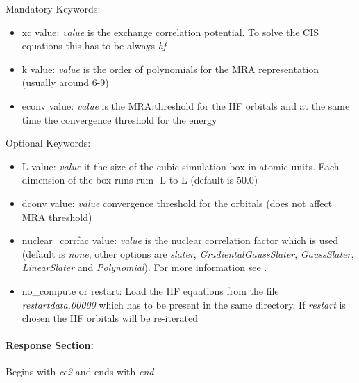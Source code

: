 \documentclass[10pt,a4paper]{scrartcl}
\begin{document}
Mandatory Keywords:
\begin{itemize}
\item xc value: \textit{value} is the exchange correlation potential. To solve the CIS equations this has to be always \textit{hf} 
\item k value: \textit{value} is the order of polynomials for the MRA representation (usually around 6-9)
\item econv value: \textit{value} is the MRA:threshold for the HF orbitals and at the same time the convergence threshold for the energy
\end{itemize}
Optional Keywords:
\begin{itemize}
\item L value: \textit{value} it the size of the cubic simulation box in atomic units. Each dimension of the box runs rum -L to L (default is 50.0)
\item dconv value: \textit{value} convergence threshold for the orbitals (does not affect MRA threshold)
\item nuclear\_corrfac value: \textit{value} is the nuclear correlation factor which is used \\
(default is \textit{none}, other options are \textit{slater}, \textit{GradientalGaussSlater}, \textit{GaussSlater}, \textit{LinearSlater} and
	    \textit{Polynomial}). For more information see \cite{nemo-I}.
\item no\_compute or restart: Load the HF equations from the file \textit{restartdata.00000} which has to be present in the same directory. If \textit{restart} is chosen the HF orbitals will be re-iterated
\end{itemize}

\paragraph{Response Section:} Begins with \textit{cc2} and ends with \textit{end}\\
\end{document}
